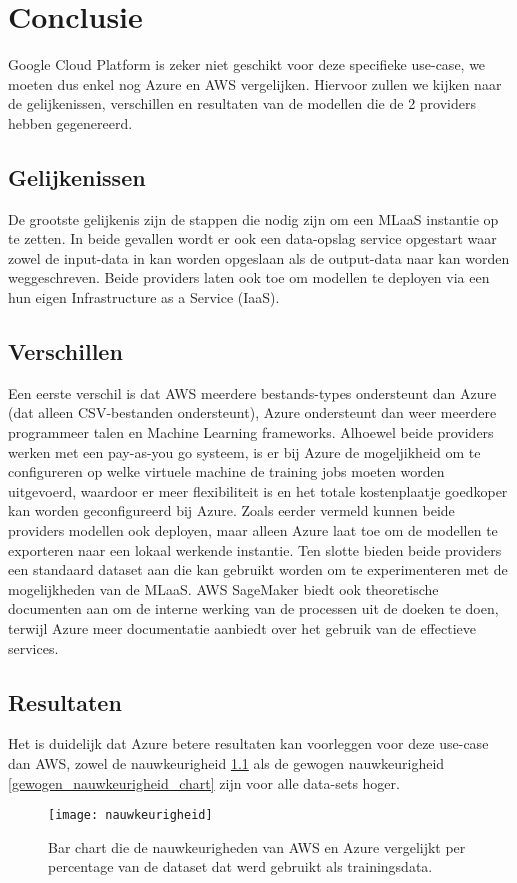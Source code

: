 \chapter{Conclusie}%
\label{ch:conclusie}


Google Cloud Platform is zeker niet geschikt voor deze specifieke use-case, we moeten dus enkel nog Azure en AWS vergelijken. Hiervoor zullen we kijken naar de gelijkenissen, verschillen en resultaten van de modellen die de 2 providers hebben gegenereerd. 

\section{Gelijkenissen}
De grootste gelijkenis zijn de stappen die nodig zijn om een MLaaS instantie op te zetten. In beide gevallen wordt er ook een data-opslag service opgestart waar zowel de input-data in kan worden opgeslaan als de output-data naar kan worden weggeschreven. Beide providers laten ook toe om modellen te deployen via een hun eigen Infrastructure as a Service (IaaS). 

\section{Verschillen}
Een eerste verschil is dat AWS meerdere bestands-types ondersteunt dan Azure (dat alleen CSV-bestanden ondersteunt), Azure ondersteunt dan weer meerdere programmeer talen en Machine Learning frameworks. Alhoewel beide providers werken met een pay-as-you go systeem, is er bij Azure de mogeljikheid om te configureren op welke virtuele machine de training jobs moeten worden uitgevoerd, waardoor er meer flexibiliteit is en het totale kostenplaatje goedkoper kan worden geconfigureerd bij Azure. Zoals eerder vermeld kunnen beide providers modellen ook deployen, maar alleen Azure laat toe om de modellen te exporteren naar een lokaal werkende instantie.
Ten slotte bieden beide providers een standaard dataset aan die kan gebruikt worden om te experimenteren met de mogelijkheden van de MLaaS. AWS SageMaker biedt ook theoretische documenten aan om de interne werking van de processen uit de doeken te doen, terwijl Azure meer documentatie aanbiedt over het gebruik van de effectieve services. 


\section{Resultaten}
Het is duidelijk dat Azure betere resultaten kan voorleggen voor deze use-case dan AWS, zowel de nauwkeurigheid \ref{nauwkeurigheid_chart} als de gewogen nauwkeurigheid \ref{gewogen_nauwkeurigheid_chart} zijn voor alle data-sets hoger.  
\begin{figure}[h]
    \caption{Bar chart die de nauwkeurigheden van AWS en Azure vergelijkt per percentage van de dataset dat werd gebruikt als trainingsdata.}
    \centering
    \label{nauwkeurigheid_chart}
    \texttt{[image: nauwkeurigheid]}
\end{figure}

